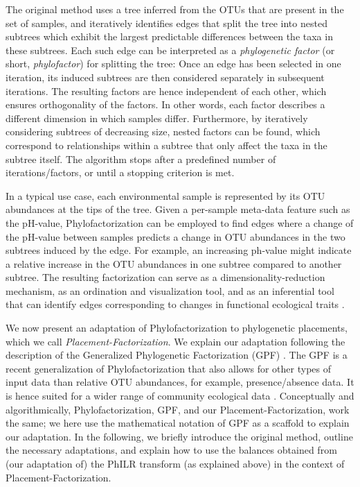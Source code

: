 The original method uses a tree inferred from the OTUs that are present in the set of samples,
and iteratively identifies edges that split the tree into nested subtrees
which exhibit the largest predictable differences between the taxa in these subtrees.
Each such edge can be interpreted as a \emph{phylogenetic factor} (or short, \emph{phylofactor}) for splitting the tree:
Once an edge has been selected in one iteration, its induced subtrees are then considered separately in subsequent iterations.
The resulting factors are hence independent of each other, which ensures orthogonality of the factors.
In other words, each factor describes a different dimension in which samples differ. %
Furthermore, by iteratively considering subtrees of decreasing size, nested factors can be found,
which correspond to relationships within a subtree that only affect the taxa in the subtree itself.
The algorithm stops after a predefined number of iterations/factors, %
or until a stopping criterion is met.

In a typical use case, each environmental sample is represented by its OTU abundances at the tips of the tree.
Given a per-sample meta-data feature such as the pH-value,
Phylofactorization can be employed to find edges where a change of the pH-value between samples
predicts a change in OTU abundances in the two subtrees induced by the edge.
For example, an increasing ph-value might indicate
a relative increase in the OTU abundances in one subtree compared to another subtree.
The resulting factorization can serve as a dimensionality-reduction mechanism, as an ordination and visualization tool,
and as an inferential tool that can identify edges corresponding to changes in functional ecological traits \cite{Washburne2017a}.

We now present an adaptation of Phylofactorization to phylogenetic placements, which we call \emph{Placement-Factorization}.
We explain our adaptation following the description of the Generalized Phylogenetic Factorization (GPF) \cite{Washburne2018,Washburne2019}.
The GPF is a recent generalization of Phylofactorization
that also allows for other types of input data than relative OTU abundances, for example, presence/absence data.
It is hence suited for a wider range of community ecological data \cite{Washburne2019}.
Conceptually and algorithmically, Phylofactorization, GPF, and our Placement-Factorization, work the same;
we here use the mathematical notation of GPF as a scaffold to explain our adaptation.
In the following, we briefly introduce the original method, outline the necessary adaptations,
and explain how to use the balances obtained from (our adaptation of)
the PhILR transform (as explained above) in the context of Placement-Factorization.


